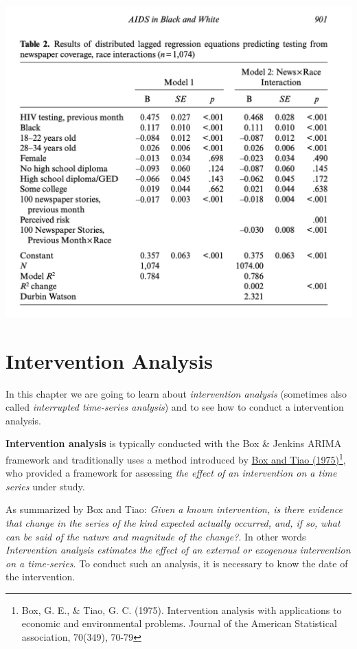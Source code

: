 \documentclass[
]{article}
\begin{document}
\includegraphics[width=14.43in]{images/AIDS in Black and White}

\hypertarget{intervention-analysis}{%
\section{Intervention Analysis}\label{intervention-analysis}}

In this chapter we are going to learn about \emph{intervention analysis} (sometimes also called \emph{interrupted time-series analysis}) and to see how to conduct a intervention analysis.

\textbf{Intervention analysis} is typically conducted with the Box \& Jenkins ARIMA framework and traditionally uses a method introduced by \href{https://www.jstor.org/stable/pdf/2285379.pdf}{Box and Tiao (1975)}\footnote{Box, G. E., \& Tiao, G. C. (1975). Intervention analysis with applications to economic and environmental problems. Journal of the American Statistical association, 70(349), 70-79}, who provided a framework for assessing \emph{the effect of an intervention on a time series} under study.

As summarized by Box and Tiao: \emph{Given a known intervention, is there evidence that change in the series of the kind expected actually occurred, and, if so, what can be said of the nature and magnitude of the change?}. In other words \emph{Intervention analysis estimates the effect of an external or exogenous intervention on a time-series}. To conduct such an analysis, it is necessary to know the date of the intervention.
\end{document}
